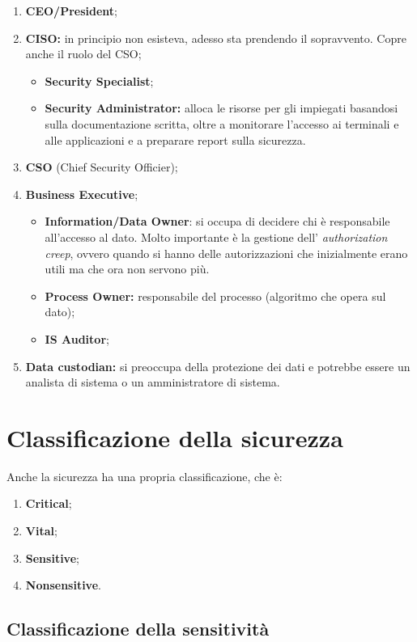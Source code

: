 \begin{enumerate}
  \item \textbf{CEO/President};
  \item \textbf{CISO:} in principio non esisteva, adesso sta prendendo il 
  sopravvento.
Copre anche il ruolo del CSO;
  \begin{itemize}
        \item \textbf{Security Specialist};
        \item \textbf{Security Administrator:} alloca le risorse per gli 
        impiegati basandosi sulla documentazione scritta, oltre a monitorare 
        l'accesso ai terminali e alle applicazioni e a preparare report sulla 
        sicurezza.
  \end{itemize}
  \item \textbf{CSO} (Chief Security Officier);
  \item \textbf{Business Executive};
  \begin{itemize}
  \item \textbf{Information/Data Owner}: si occupa di decidere chi è 
  responsabile all'accesso al dato. Molto importante è la gestione dell'
  \textit{authorization creep}, ovvero quando si hanno delle autorizzazioni 
  che inizialmente erano 
  utili ma che ora non servono più.
  \item \textbf{Process Owner:} responsabile del processo (algoritmo che opera 
  sul dato);
  \item \textbf{IS Auditor};
  \end{itemize}
  \item \textbf{Data custodian:} si preoccupa della protezione dei dati e 
  potrebbe essere un analista di sistema o un amministratore di sistema.
\end{enumerate}

\section{Classificazione della sicurezza}

Anche la sicurezza ha una propria classificazione, che è:
\begin{enumerate}
  \item \textbf{Critical};
  \item \textbf{Vital};
  \item \textbf{Sensitive};
  \item \textbf{Nonsensitive}.
\end{enumerate}

\subsection{Classificazione della sensitività}

